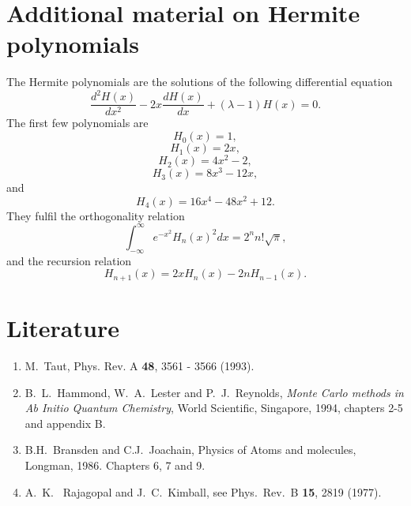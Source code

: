 \documentclass[10pt]{article}
\begin{document}
\section*{Additional material on Hermite polynomials}

The Hermite polynomials are the solutions of the following differential
equation
\begin{equation}
   \frac{d^2H(x)}{dx^2}-2x\frac{dH(x)}{dx}+(\lambda-1)H(x)=0.
   \label{eq:hermite}
\end{equation}
The first few polynomials are
\[
   H_0(x)=1,
\]
\[
    H_1(x)=2x,
\]
\[
    H_2(x)=4x^2-2,
\]
\[
    H_3(x)=8x^3-12x,
\]
and
\[
    H_4(x)=16x^4-48x^2+12.
\]
They fulfil the orthogonality relation
\[
  \int_{-\infty}^{\infty}e^{-x^2}H_n(x)^2dx=2^nn!\sqrt{\pi},
\]
and the recursion relation
\[
  H_{n+1}(x)=2xH_{n}(x)-2nH_{n-1}(x).
\]




\section*{Literature}
\begin{enumerate}
\item M.~Taut, Phys. Rev. A {\bf 48}, 3561 - 3566 (1993).
\item B.~L.~Hammond, W.~A.~Lester and P.~J.~Reynolds, {\em Monte Carlo methods in Ab Initio Quantum Chemistry}, World Scientific, Singapore, 1994, chapters
2-5 and appendix B.
\item B.H.~Bransden and C.J.~Joachain, Physics of Atoms and molecules,
Longman, 1986. Chapters 6, 7 and 9.
\item A.~K.~ Rajagopal and J.~C.~Kimball, see Phys.~Rev.~B {\bf 15}, 2819 (1977).
\end{enumerate}
\end{document}
